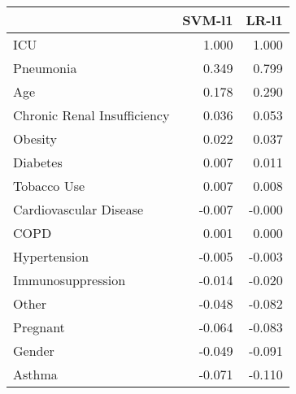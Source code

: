 \begin{tabular}{lrr}
\toprule
{} &  SVM-l1 &  LR-l1 \\
\midrule
ICU                         &   1.000 &  1.000 \\
Pneumonia                   &   0.349 &  0.799 \\
Age                         &   0.178 &  0.290 \\
Chronic Renal Insufficiency &   0.036 &  0.053 \\
Obesity                     &   0.022 &  0.037 \\
Diabetes                    &   0.007 &  0.011 \\
Tobacco Use                 &   0.007 &  0.008 \\
Cardiovascular Disease      &  -0.007 & -0.000 \\
COPD                        &   0.001 &  0.000 \\
Hypertension                &  -0.005 & -0.003 \\
Immunosuppression           &  -0.014 & -0.020 \\
Other                       &  -0.048 & -0.082 \\
Pregnant                    &  -0.064 & -0.083 \\
Gender                      &  -0.049 & -0.091 \\
Asthma                      &  -0.071 & -0.110 \\
\bottomrule
\end{tabular}
